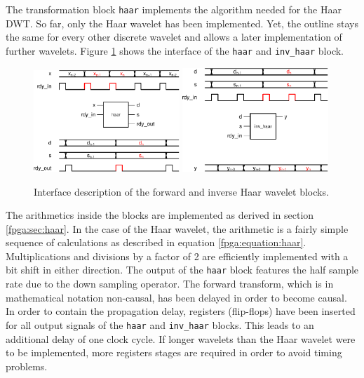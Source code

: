 \begin{refsection}
The transformation block \texttt{haar} implements the algorithm needed for the Haar DWT.
So far, only the Haar wavelet has been implemented.
Yet, the outline stays the same for every other discrete wavelet and allows a later implementation of further wavelets.
Figure \ref{fpga:fig:haar} shows the interface of the \texttt{haar} and \texttt{inv\_haar} block.
\begin{figure}
	\centering
	\includegraphics[width=0.49\textwidth]{papers/fpga/images/haar.pdf} %
	\includegraphics[width=0.49\textwidth]{papers/fpga/images/inv_haar.pdf}
	\caption{Interface description of the forward and inverse Haar wavelet blocks. \label{fpga:fig:haar}}
\end{figure}
The arithmetics inside the blocks are implemented as derived in section \ref{fpga:sec:haar}.
In the case of the Haar wavelet, the arithmetic is a fairly simple sequence of calculations as described in equation \ref{fpga:equation:haar}.
Multiplications and divisions by a factor of 2 are efficiently implemented with a bit shift in either direction.
The output of the \texttt{haar} block features the half sample rate due to the down sampling operator.
The forward transform, which is in mathematical notation non-causal, has been delayed in order to become causal.
In order to contain the propagation delay, registers (flip-flops) have been inserted for all output signals of the \texttt{haar} and \texttt{inv\_haar} blocks.
This leads to an additional delay of one clock cycle.
If longer wavelets than the Haar wavelet were to be implemented, more registers stages are required in order to avoid timing problems. %


\end{refsection}
